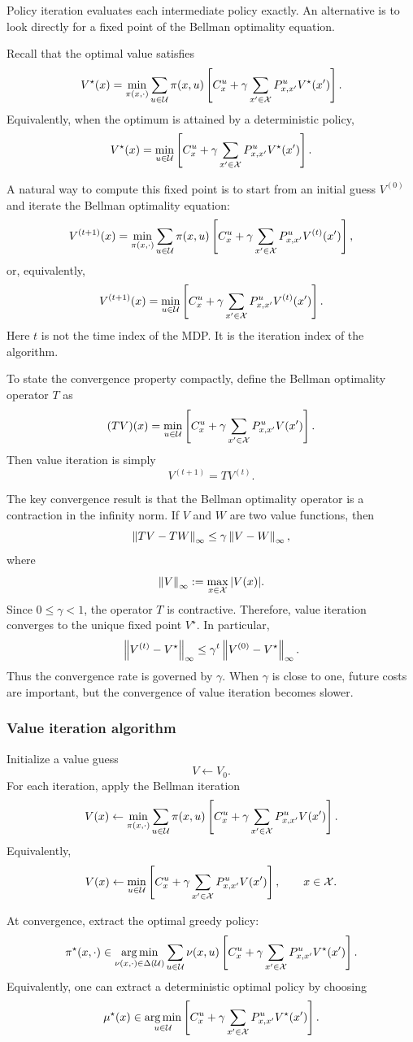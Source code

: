 Policy iteration evaluates each intermediate policy exactly. An alternative is to look directly
for a fixed point of the Bellman optimality equation.

Recall that the optimal value satisfies
\[
V^\star(x)
=
\min_{\pi(x,\cdot)}
\sum_{u\in\mathcal{U}}\pi(x,u)
\left[
C_x^u
+
\gamma\sum_{x'\in\mathcal{X}}P^u_{x,x'}V^\star(x')
\right].
\]
Equivalently, when the optimum is attained by a deterministic policy,
\[
V^\star(x)
=
\min_{u\in\mathcal{U}}
\left[
C_x^u
+
\gamma\sum_{x'\in\mathcal{X}}P^u_{x,x'}V^\star(x')
\right].
\]

A natural way to compute this fixed point is to start from an initial guess \(V^{(0)}\) and
iterate the Bellman optimality equation:
\[
V^{(t+1)}(x)
=
\min_{\pi(x,\cdot)}
\sum_{u\in\mathcal{U}}\pi(x,u)
\left[
C_x^u
+
\gamma\sum_{x'\in\mathcal{X}}P^u_{x,x'}V^{(t)}(x')
\right],
\]
or, equivalently,
\[
V^{(t+1)}(x)
=
\min_{u\in\mathcal{U}}
\left[
C_x^u
+
\gamma\sum_{x'\in\mathcal{X}}P^u_{x,x'}V^{(t)}(x')
\right].
\]
Here \(t\) is not the time index of the MDP. It is the iteration index of the algorithm.

To state the convergence property compactly, define the Bellman optimality operator \(T\) as
\[
(TV)(x)
=
\min_{u\in\mathcal{U}}
\left[
C_x^u
+
\gamma\sum_{x'\in\mathcal{X}}P^u_{x,x'}V(x')
\right].
\]
Then value iteration is simply
\[
V^{(t+1)}=TV^{(t)}.
\]

The key convergence result is that the Bellman optimality operator is a contraction in the
infinity norm. If \(V\) and \(W\) are two value functions, then
\[
\left\lVert TV-TW \right\rVert_{\infty}
\le
\gamma\left\lVert V-W \right\rVert_{\infty},
\]
where
\[
\left\lVert V \right\rVert_{\infty}
:=
\max_{x\in\mathcal{X}}|V(x)|.
\]
Since \(0\le\gamma<1\), the operator \(T\) is contractive. Therefore, value iteration converges
to the unique fixed point \(V^\star\). In particular,
\[
\left\lVert V^{(t)}-V^\star \right\rVert_{\infty}
\le
\gamma^t\left\lVert V^{(0)}-V^\star \right\rVert_{\infty}.
\]
Thus the convergence rate is governed by \(\gamma\). When \(\gamma\) is close to one, future
costs are important, but the convergence of value iteration becomes slower.

\subsubsection{Value iteration algorithm}

\begin{theorembox}
Initialize a value guess
\[
V\leftarrow V_0.
\]
For each iteration, apply the Bellman iteration
\[
V(x)
\leftarrow
\min_{\pi(x,\cdot)}
\sum_{u\in\mathcal{U}}\pi(x,u)
\left[
C_x^u
+
\gamma\sum_{x'\in\mathcal{X}}P^u_{x,x'}V(x')
\right].
\]
Equivalently,
\[
V(x)
\leftarrow
\min_{u\in\mathcal{U}}
\left[
C_x^u
+
\gamma\sum_{x'\in\mathcal{X}}P^u_{x,x'}V(x')
\right],
\qquad x\in\mathcal{X}.
\]

At convergence, extract the optimal greedy policy:
\[
\pi^\star(x,\cdot)
\in
\operatorname*{arg\,min}_{\nu(x,\cdot)\in\Delta(\mathcal{U})}
\sum_{u\in\mathcal{U}}\nu(x,u)
\left[
C_x^u
+
\gamma\sum_{x'\in\mathcal{X}}P^u_{x,x'}V^\star(x')
\right].
\]
Equivalently, one can extract a deterministic optimal policy by choosing
\[
\mu^\star(x)
\in
\operatorname*{arg\,min}_{u\in\mathcal{U}}
\left[
C_x^u
+
\gamma\sum_{x'\in\mathcal{X}}P^u_{x,x'}V^\star(x')
\right].
\]
\end{theorembox}

